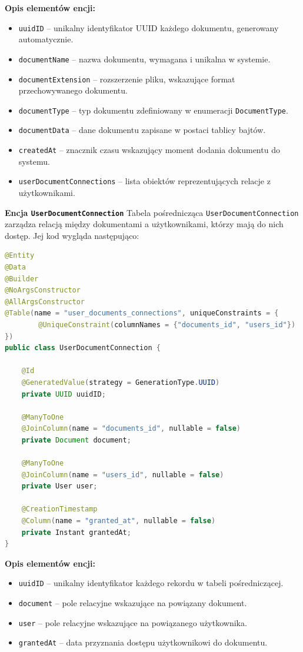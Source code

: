 \textbf{Opis elementów encji:}
\begin{itemize}
    \item \texttt{uuidID} -- unikalny identyfikator UUID każdego dokumentu, generowany automatycznie.
    \item \texttt{documentName} -- nazwa dokumentu, wymagana i unikalna w systemie.
    \item \texttt{documentExtension} -- rozszerzenie pliku, wskazujące format przechowywanego dokumentu.
    \item \texttt{documentType} -- typ dokumentu zdefiniowany w enumeracji \texttt{DocumentType}.
    \item \texttt{documentData} -- dane dokumentu zapisane w postaci tablicy bajtów.
    \item \texttt{createdAt} -- znacznik czasu wskazujący moment dodania dokumentu do systemu.
    \item \texttt{userDocumentConnections} -- lista obiektów reprezentujących relacje z użytkownikami.
\end{itemize}

\textbf{Encja \texttt{UserDocumentConnection}}  
Tabela pośrednicząca \texttt{UserDocumentConnection} zarządza relacją między dokumentami a użytkownikami, którzy mają do nich dostęp. Jej kod wygląda następująco:

\begin{lstlisting}[language=Java, caption=Encja \texttt{UserDocumentConnection}]
@Entity
@Data
@Builder
@NoArgsConstructor
@AllArgsConstructor
@Table(name = "user_documents_connections", uniqueConstraints = {
        @UniqueConstraint(columnNames = {"documents_id", "users_id"})
})
public class UserDocumentConnection {

    @Id
    @GeneratedValue(strategy = GenerationType.UUID)
    private UUID uuidID;

    @ManyToOne
    @JoinColumn(name = "documents_id", nullable = false)
    private Document document;

    @ManyToOne
    @JoinColumn(name = "users_id", nullable = false)
    private User user;

    @CreationTimestamp
    @Column(name = "granted_at", nullable = false)
    private Instant grantedAt;
}
\end{lstlisting}

\textbf{Opis elementów encji:}
\begin{itemize}
    \item \texttt{uuidID} -- unikalny identyfikator każdego rekordu w tabeli pośredniczącej.
    \item \texttt{document} -- pole relacyjne wskazujące na powiązany dokument.
    \item \texttt{user} -- pole relacyjne wskazujące na powiązanego użytkownika.
    \item \texttt{grantedAt} -- data przyznania dostępu użytkownikowi do dokumentu.
\end{itemize}

